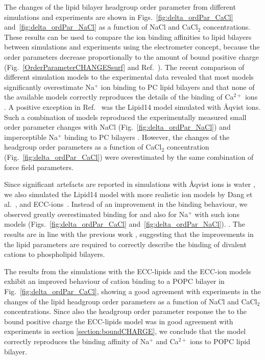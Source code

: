\documentclass[aip,jcp,twocolumn]{revtex4}
\begin{document}
The changes of the lipid bilayer headgroup order parameter from different simulations and
experiments \cite{akutsu81,altenbach84} are shown in Figs.~\ref{fig:delta_ordPar_CaCl} and~\ref{fig:delta_ordPar_NaCl}
as a function of NaCl and CaCl$_2$ concentrations.
These results can be used to compare the ion binding affinities to lipid bilayers
between simulations and experiments using the electrometer concept, because 
the order parameters decrease proportionally 
to the amount of bound positive charge (Fig.~\ref{OrderParameterCHANGESsurf} and Ref.~). 
The recent comparison of different simulation models to the experimental data
revealed that most models significantly overestimate Na$^+$ ion binding to PC
lipid bilayers and that none of the available models correctly reproduces
the details of the binding of Ca$^{2+}$ ions \cite{catte16}.
A positive exception in Ref.~ was the Lipid14 model \cite{dickson14} simulated with \AA{}qvist ions.
Such a combination of models reproduced the experimentally measured 
small order parameter changes with NaCl (Fig.~\ref{fig:delta_ordPar_NaCl})
and imperceptible Na$^+$ binding to PC bilayers \cite{akutsu81,altenbach84}.
However, the changes of the headgroup order parameters as a function of CaCl$_2$ concentration 
(Fig.~\ref{fig:delta_ordPar_CaCl}) were overestimated by the same combination of force field parameters.

Since significant artefacts are reported in simulations with \AA{}qvist ions is water \cite{auffinger07},
we also simulated the Lipid14 model with more realistic ion models by Dang et al.~\cite{smith94,chang1999,dang2006}, and
ECC-ions~\cite{jungwirth17-new-paper-to-be-published, Pluharova2014}. 
Instead of an improvement in the binding behaviour,
we observed greatly overestimated binding for  and also for Na$^+$ with such ions models 
(Figs.~\ref{fig:delta_ordPar_CaCl} and~\ref{fig:delta_ordPar_NaCl}). 
.
The results are in line with the previous work \cite{catte16},
suggesting that the improvements in the lipid parameters are
required to correctly describe the binding of divalent cations to phospholipid bilayers.

The results from the simulations with the ECC-lipids and the ECC-ion models \cite{jungwirth17-new-paper-to-be-published, kohagen16, Pluharova2014}
exhibit an improved behaviour of cation binding to a POPC bilayer in Fig.~\ref{fig:delta_ordPar_CaCl},
showing a good agreement with experiments in the changes of 
the lipid headgroup order parameters as a function of NaCl and CaCl$_2$ concentrations.
Since also the headgroup order parameter
response the to the bound positive charge the ECC-lipids model
was in good agreement with experiments in section \ref{section:boundCHARGE},
we conclude that the model correctly reproduces the binding affinity of
Na$^{+}$ and Ca$^{2+}$ ions to POPC lipid bilayer.
\end{document}
